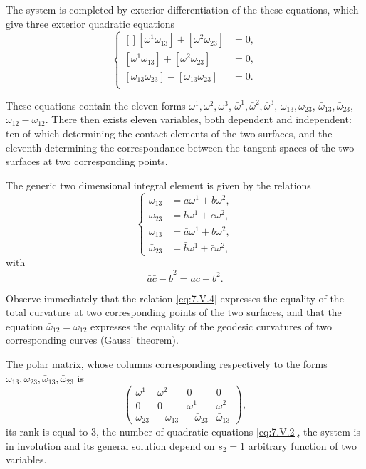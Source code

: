\documentclass[leqno,11pt]{book}
\numberwithin{equation}{chapter}
\theoremstyle{shape1}
\theoremstyle{shape0}
\theoremstyle{shape2}
\theoremstyle{definition}
\begin{document}
The system is completed by exterior differentiation of the these equations, which give three exterior quadratic equations
\begin{equation}
  \label{eq:7.V.2}\tag{V, 2}
  \left\{
    \begin{aligned}[]
      [\omega^{1}\omega_{13}]+[\omega^{2}\omega_{23}]&=0,\\
      [\omega^{1}\bar\omega_{13}]+[\omega^{2}\bar\omega_{23}]&=0,\\
      [\bar\omega_{13}\bar\omega_{23}]-[\omega_{13}\omega_{23}]&=0.\\
    \end{aligned}
  \right.
\end{equation}

These equations contain the eleven forms $\omega^{1},\omega^{2},\omega^{3}$, $\bar\omega^{1},\bar\omega^{2},\bar\omega^{3}$, $\omega_{13},\omega_{23}$, $\bar\omega_{13},\bar\omega_{23}$, $\bar\omega_{12}-\omega_{12}$.
There then exists eleven variables, both dependent and independent: ten of which determining the contact elements of the two surfaces, and the eleventh determining the correspondance between the tangent spaces of the two surfaces at two corresponding points.

The generic two dimensional integral element is given by the relations
\begin{equation}
  \label{eq:7.V.3}\tag{V, 3}
  \left\{
    \begin{aligned}
      \omega_{13}&=a\omega^{1}+b\omega^{2},\\
      \omega_{23}&=b\omega^{1}+c\omega^{2},\\
      \bar\omega_{13}&=\bar a\omega^{1}+\bar b\omega^{2},\\
      \bar\omega_{23}&=\bar b\omega^{1}+\bar c\omega^{2},
    \end{aligned}
  \right.
\end{equation}
with 
\begin{equation}
  \label{eq:7.V.4}\tag{V, 4}
  \bar a\bar c-\bar b^{2}=ac-b^{2}.
\end{equation}

Observe immediately that the relation \eqref{eq:7.V.4} expresses the equality of the total curvature at two corresponding points of the two surfaces, and that the equation $\bar\omega_{12}=\omega_{12}$ expresses the equality of the geodesic curvatures of two corresponding curves (Gauss' theorem).

The polar matrix, whose columns corresponding respectively to the forms $\omega_{13},\omega_{23},\bar\omega_{13},\bar\omega_{23}$ is
\[
\begin{pmatrix}
  \omega^{1}&\omega^{2}&0&0\\
  0&0&\omega^{1}&\omega^{2}\\
  \omega_{23}&-\omega_{13}&-\bar\omega_{23}&\bar\omega_{13}
\end{pmatrix},
\]
its rank is equal to $3$, the number of quadratic equations \eqref{eq:7.V.2}, the system is in involution and its general solution depend on $s_{2}=1$ arbitrary function of two variables.
\end{document}
